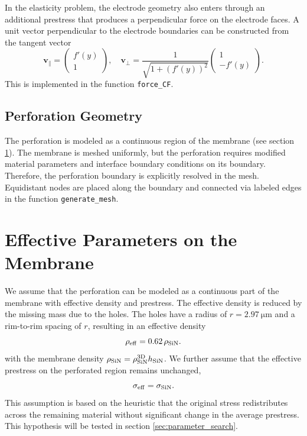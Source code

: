 In the elasticity problem, the electrode geometry also enters through an additional prestress that produces a perpendicular force on the electrode faces. A unit vector perpendicular to the electrode boundaries can be constructed from the tangent vector
\[
\mathbf{v}_\parallel = 
\begin{pmatrix}
f'(y) \\ 1
\end{pmatrix}, 
\quad
\mathbf{v}_\perp = \frac{1}{\sqrt{1+(f'(y))^2}}
\begin{pmatrix}
1 \\ -f'(y)
\end{pmatrix}.
\] 
This is implemented in the function \texttt{force\_CF}.\\

\subsection{Perforation Geometry}

The perforation is modeled as a continuous region of the membrane (see section \ref{sec:definition_effective_parameters}). The membrane is meshed uniformly, but the perforation requires modified material parameters and interface boundary conditions on its boundary. Therefore, the perforation boundary is explicitly resolved in the mesh. Equidistant nodes are placed along the boundary and connected via labeled edges in the function \texttt{generate\_mesh}.\\

\section{Effective Parameters on the Membrane}
\label{sec:definition_effective_parameters}

We assume that the perforation can be modeled as a continuous part of the membrane with effective density and prestress. The effective density is reduced by the missing mass due to the holes. The holes have a radius of $r = \SI{2.97}{\micro\meter}$ and a rim-to-rim spacing of $r$, resulting in an effective density
\[
\rho_\mathrm{eff} = 0.62\, \rho_{\mathrm{SiN}}.
\]
with the membrane density $\rho_{\mathrm{SiN}} = \rho^{\mathrm{3D}}_{\mathrm{SiN}} h_{\mathrm{SiN}}$.
We further assume that the effective prestress on the perforated region remains unchanged,
\[
\sigma_\mathrm{eff} = \sigma_{\mathrm{SiN}}.
\]
This assumption is based on the heuristic that the original stress redistributes across the remaining material without significant change in the average prestress. This hypothesis will be tested in section \ref{sec:parameter_search}.  

